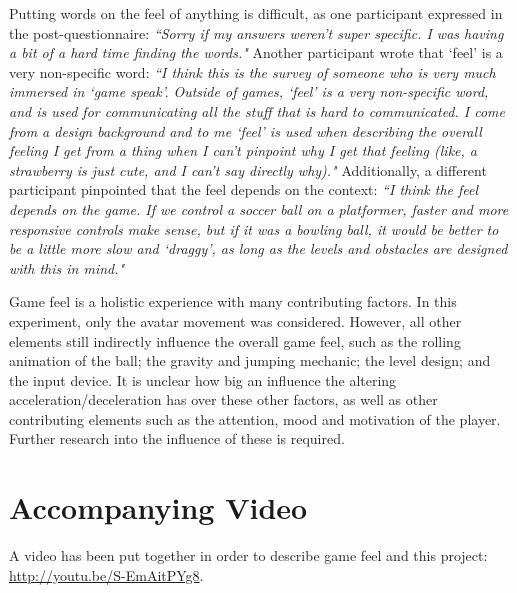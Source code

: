 Putting words on the feel of anything is difficult, as one participant expressed in the post-questionnaire: \textit{``Sorry if my answers weren't super specific. I was having a bit of a hard time finding the words."} Another participant wrote that `feel' is a very non-specific word: \textit{``I think this is the survey of someone who is very much immersed in `game speak'. Outside of games, `feel' is a very non-specific word, and is used for communicating all the stuff that is hard to communicated. I come from a design background and to me `feel' is used when describing the overall feeling I get from a thing when I can't pinpoint why I get that feeling (like, a strawberry is just cute, and I can't say directly why)."} Additionally, a different participant pinpointed that the feel depends on the context: \textit{``I think the feel depends on the game. If we control a soccer ball on a platformer, faster and more responsive controls make sense, but if it was a bowling ball, it would be better to be a little more slow and `draggy', as long as the levels and obstacles are designed with this in mind."}

Game feel is a holistic experience with many contributing factors. In this experiment, only the avatar movement was considered. However, all other elements still indirectly influence the overall game feel, such as the rolling animation of the ball; the gravity and jumping mechanic; the level design; and the input device. It is unclear how big an influence the altering acceleration/deceleration has over these other factors, as well as other contributing elements such as the attention, mood and motivation of the player. Further research into the influence of these is required.

\section{Accompanying Video}
A video has been put together in order to describe game feel and this project: \url{http://youtu.be/S-EmAitPYg8}.